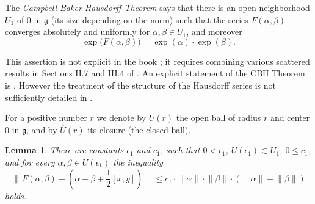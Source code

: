 \documentclass[10pt, a4paper]{amsart}
\newtheorem{lem}[equation]{Lemma}
\theoremstyle{definition}
\numberwithin{equation}{section}
\newcommand{\ol}{\overline}
\newcommand{\mfrak}[1]{\mathfrak{#1}}
\newcommand{\smfrac}[2]{{\textstyle \frac{#1}{#2}}}
\newcommand{\norm}[1]{\lVert #1 \rVert}
\newcommand{\Norm}[1]{\bigl\lVert\, #1 \, \bigr\rVert}
\newcommand{\g}{\mfrak{g}}
\begin{document}
The {\em Campbell-Baker-Hausdorff Theorem} says that 
there is an open neighborhood $U_1$ of $0$ in $\g$ 
(its size depending on the norm) such that the series
$F(\alpha, \beta)$ converges absolutely and uniformly for 
$\alpha, \beta \in U_1$, and moreover 
\begin{equation} \label{eqn:87}
\exp \bigl( F(\alpha, \beta) \bigr) = 
\exp(\alpha) \cdot \exp(\beta) .
\end{equation}

This assertion is not explicit in the book \cite{Bo}; it
requires combining various scattered results in Sections II.7 and III.4
of \cite{Bo}. An explicit statement of the CBH Theorem is 
\cite[Theorem 2.15.4]{Va}. However the treatment of the structure of the
Hausdorff series is not sufficiently detailed in \cite{Va}. 

For a positive number $r$ we denote by $U(r)$ the open ball of radius $r$ and
center $0$ in $\g$, and by $\ol{U}(r)$ its closure (the closed ball). 

\begin{lem} \label{lem:35}
There are constants $\epsilon_1$ and $c_1$, such that
$0 < \epsilon_1$,
$U(\epsilon_1 ) \subset U_1$, $0 \leq c_1$, and for every 
$\alpha, \beta \in U(\epsilon_1)$ the inequality
\[ \Norm{ F(\alpha, \beta) - 
(\alpha + \beta + \smfrac{1}{2} [x,y]) } 
\leq c_1 \cdot \norm{\alpha} \cdot 
\norm{\beta} \cdot (\norm{\alpha} + \norm{\beta})  \]
holds.
\end{lem}
\end{document}
